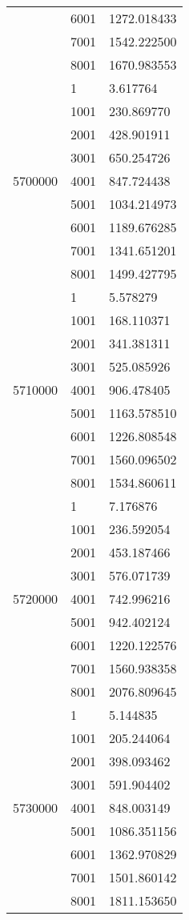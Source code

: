 \begin{table}[htb!]
\begin{tabular}{lll}
 & 6001 & 1272.018433 \\
 & 7001 & 1542.222500 \\
 & 8001 & 1670.983553 \\
\multirow[c]{9}{*}{5700000} & 1 & 3.617764 \\
 & 1001 & 230.869770 \\
 & 2001 & 428.901911 \\
 & 3001 & 650.254726 \\
 & 4001 & 847.724438 \\
 & 5001 & 1034.214973 \\
 & 6001 & 1189.676285 \\
 & 7001 & 1341.651201 \\
 & 8001 & 1499.427795 \\
\multirow[c]{9}{*}{5710000} & 1 & 5.578279 \\
 & 1001 & 168.110371 \\
 & 2001 & 341.381311 \\
 & 3001 & 525.085926 \\
 & 4001 & 906.478405 \\
 & 5001 & 1163.578510 \\
 & 6001 & 1226.808548 \\
 & 7001 & 1560.096502 \\
 & 8001 & 1534.860611 \\
\multirow[c]{9}{*}{5720000} & 1 & 7.176876 \\
 & 1001 & 236.592054 \\
 & 2001 & 453.187466 \\
 & 3001 & 576.071739 \\
 & 4001 & 742.996216 \\
 & 5001 & 942.402124 \\
 & 6001 & 1220.122576 \\
 & 7001 & 1560.938358 \\
 & 8001 & 2076.809645 \\
\multirow[c]{9}{*}{5730000} & 1 & 5.144835 \\
 & 1001 & 205.244064 \\
 & 2001 & 398.093462 \\
 & 3001 & 591.904402 \\
 & 4001 & 848.003149 \\
 & 5001 & 1086.351156 \\
 & 6001 & 1362.970829 \\
 & 7001 & 1501.860142 \\
 & 8001 & 1811.153650 \\

\end{tabular}
\end{table}
